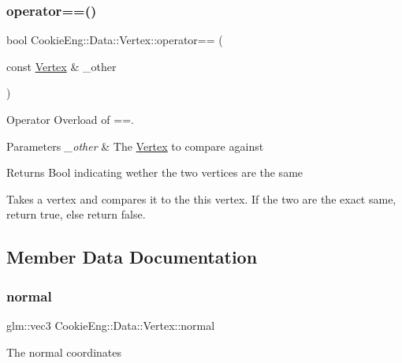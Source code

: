 \subsubsection{\texorpdfstring{operator==()}{operator==()}}
{\footnotesize\ttfamily bool Cookie\+Eng\+::\+Data\+::\+Vertex\+::operator== (\begin{DoxyParamCaption}\item[{const \hyperlink{struct_cookie_eng_1_1_data_1_1_vertex}{Vertex} \&}]{\+\_\+other }\end{DoxyParamCaption})}



Operator Overload of ==. 


\begin{DoxyParams}{Parameters}
{\em \+\_\+other} & The \hyperlink{struct_cookie_eng_1_1_data_1_1_vertex}{Vertex} to compare against \\
\hline
\end{DoxyParams}
\begin{DoxyReturn}{Returns}
Bool indicating wether the two vertices are the same
\end{DoxyReturn}
Takes a vertex and compares it to the this vertex. If the two are the exact same, return true, else return false. 

\subsection{Member Data Documentation}
\mbox{\label{struct_cookie_eng_1_1_data_1_1_vertex_a8bc3a87d6213bba88c6f095b149aba8a}} 
\subsubsection{\texorpdfstring{normal}{normal}}
{\footnotesize\ttfamily glm\+::vec3 Cookie\+Eng\+::\+Data\+::\+Vertex\+::normal}

The normal coordinates \mbox{\label{struct_cookie_eng_1_1_data_1_1_vertex_aa199133d6ee0571a67dfdcccfb59ffeb}} 
